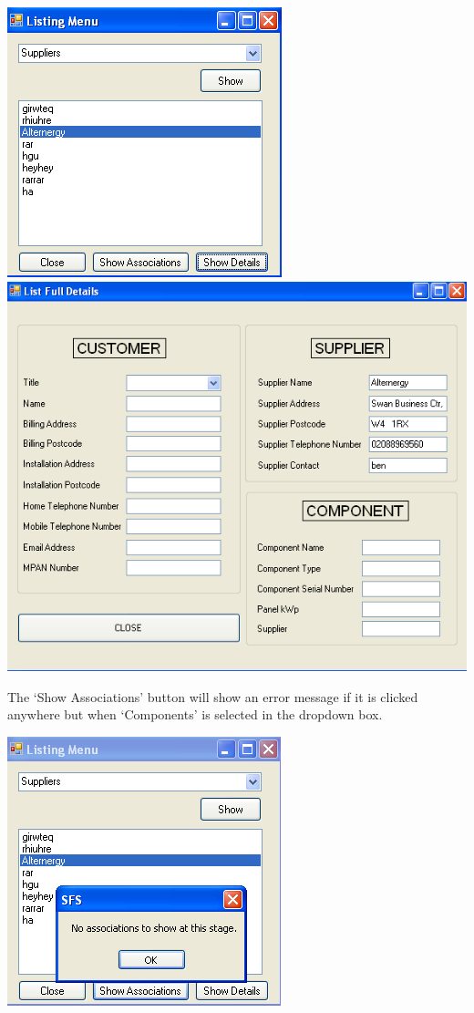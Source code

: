 		\includegraphics[scale=0.5]{supplier-frmList-lfd_scrot}
		\includegraphics[scale=0.25]{supplier-frmListFullDetails_scrot}
		
		The `Show Associations' button will show an error message if it is clicked anywhere but when `Components' is selected in the dropdown box.
		
		\includegraphics[scale=0.5]{supplier-frmList-sa_scrot}
		
